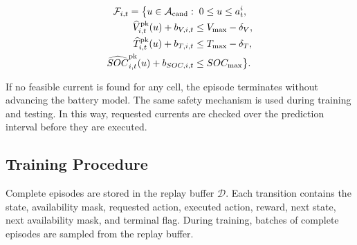 
\begin{equation}
\label{eq:safety_candidates}
\begin{gathered}
\mathcal{F}_{i,t}=\bigl\{u\in\mathcal{A}_{\mathrm{cand}}:\;0\leq u\leq a_t^i,\\[-1pt]
\begin{aligned}
\widehat{V}_{i,t}^{\mathrm{pk}}(u)+b_{V,i,t}&\leq V_{\max}-\delta_V,\\[-1pt]
\widehat{T}_{i,t}^{\mathrm{pk}}(u)+b_{T,i,t}&\leq T_{\max}-\delta_T,\\[-1pt]
\widehat{SOC}_{i,t}^{\mathrm{pk}}(u)+b_{SOC,i,t}&\leq SOC_{\max}\bigr\}.
\end{aligned}
\end{gathered}
\end{equation}


If no feasible current is found for any cell, the episode terminates without advancing the battery model. The same safety mechanism is used during training and testing. In this way, requested currents are checked over the prediction interval before they are executed.

\subsection{Training Procedure}

Complete episodes are stored in the replay buffer $\mathcal{D}$. Each transition contains the state, availability mask, requested action, executed action, reward, next state, next availability mask, and terminal flag. During training, batches of complete episodes are sampled from the replay buffer.

